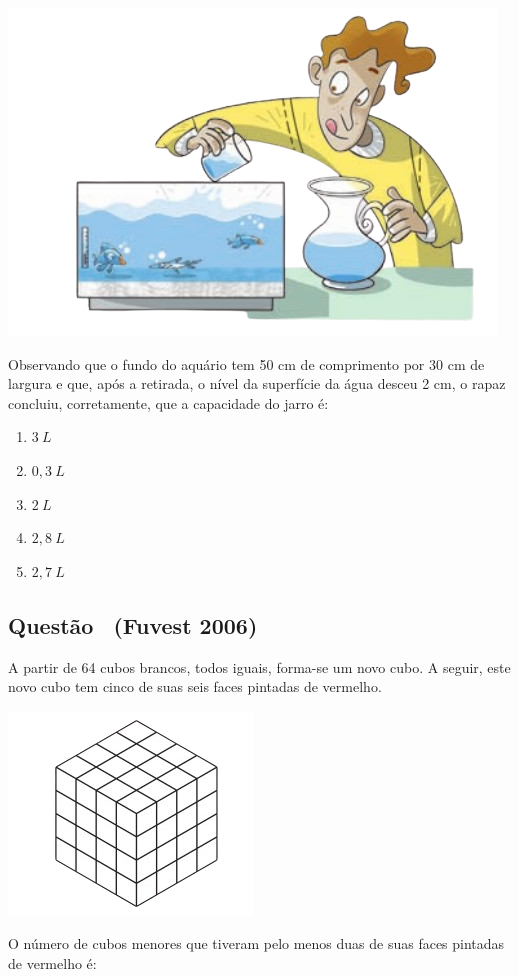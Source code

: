 \documentclass[12pt]{article}
\newcounter{questao}
\newcommand{\novaquestao}[1]{%
  \stepcounter{questao}%
  \subsection*{Questão \thequestao\ (#1)}%
}
\begin{document}
\begin{multicols}{2}
            \begin{center}
                \includegraphics[scale=0.5]{imagem/paiva-aquario.png}
            \end{center} Observando que o fundo do aquário tem 50 cm de
            comprimento por 30 cm de largura e que, após a
            retirada, o nível da superfície da água desceu 2 cm,
            o rapaz concluiu, corretamente, que a capacidade
            do jarro é:

            \begin{enumerate}[label=(\alph*), noitemsep]
                \item $3\ L$ %
                \item $0,3\  L$
                \item $2\ L$
                \item $2,8\ L$
                \item $2,7\  L$
            \end{enumerate}

        \novaquestao{Fuvest 2006}

            A partir de 64 cubos brancos, todos iguais, forma-se um novo cubo. A seguir, este novo cubo tem cinco de suas seis faces pintadas de vermelho.

            \begin{center}
                \includegraphics[scale=0.7]{imagem/fuvest-cubo.png}
            \end{center} O número de cubos menores que tiveram pelo menos duas de suas faces pintadas de vermelho é:


\end{multicols}
\end{document}
